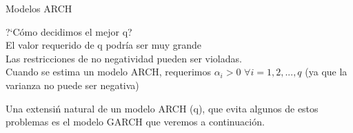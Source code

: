 \documentclass[xcolor=(list of options)]{beamer}
\begin{document}
\begin{section}{Modelos ARCH}
\begin{frame}
?`C\'omo decidimos el mejor q?\\

El valor requerido de q podría ser muy grande\\

Las restricciones de no negatividad pueden ser violadas.\\

Cuando se estima un modelo ARCH, requerimos $\alpha_i >0$ $\forall i=1,2,...,q$ (ya que la varianza no puede ser negativa)

Una extensi\'n natural de un modelo ARCH (q), que evita algunos de estos problemas es el modelo GARCH que veremos a continuaci\'on.


\end{frame}
\end{section}
\end{document}
